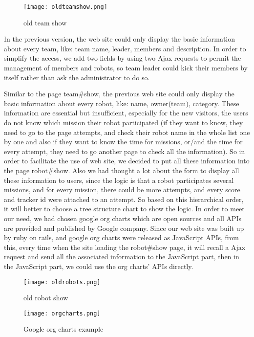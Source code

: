 \begin{figure}[h!]
\centering
\texttt{[image: oldteamshow.png]}
\caption{old team show}
\label{fig-sample}
\end{figure}
In the previous version, the web site could only display the basic information about every team, like: team name, leader, members and description. In order to simplify the access, we add two fields by using two Ajax requests to permit the management of members and robots, so team leader could kick their members by itself rather than ask the administrator to do so. 

Similar to the page team\#show, the previous web site could only display the basic information about every robot, like: name, owner(team), category. These information are essential but insufficient, especially for the new visitors, the users do not know which mission their robot participated (if they want to know, they need to go to the page attempts, and check their robot name in the whole list one by one and also if they want to know the time for missions, or/and the time for every attempt, they need to go another page to check all the information). So in order to facilitate the use of web site, we decided to put all these information into the page robot\#show. Also we had thought a lot about the form to display all these information to users, since the logic is that a robot participates several missions, and for every mission, there could be more attempts, and every score and tracker id were attached to an attempt. So based on this hierarchical order, it will better to choose a tree structure chart to show the logic. In order to meet our need, we had chosen google org charts which are open sources and all APIs are provided and published by Google company. Since our web site was built up by ruby on rails, and google org charts were released as JavaScript APIs, from this, every time when the site loading the robot\#show page, it will recall a Ajax request and send all the associated information to the JavaScript part, then in the JavaScript part, we could use the org charts' APIs directly. 
\begin{figure}[h!]
\centering
\texttt{[image: oldrobots.png]}
\caption{old robot show}
\label{fig-sample}
\end{figure}
\begin{figure}[h!]
\centering
\texttt{[image: orgcharts.png]}
\caption{Google org charts example }
\label{fig-sample}
\end{figure}

